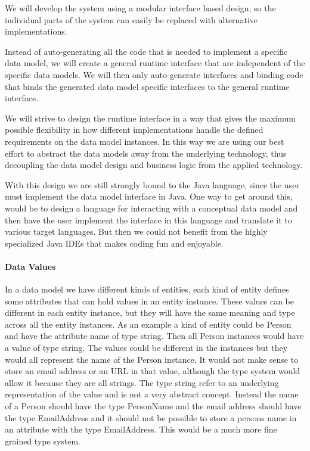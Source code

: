 We will develop the system using a modular interface based design,
so the individual parts of the system can easily be replaced with
alternative implementations.

Instead of auto-generating all the code that is needed to implement
a specific data model, we will create a general runtime interface
that are independent of the specific data models. We will then only
auto-generate interfaces and binding code that binds the generated
data model specific interfaces to the general runtime interface.

We will strive to design the runtime interface in a way that gives
the maximum possible flexibility in how different implementations
handle the defined requirements on the data model instances. In this
way we are using our best effort to abstract the data models away
from the underlying technology, thus decoupling the data model design
and business logic from the applied technology.

With this design we are still strongly bound to the Java language,
since the user must implement the data model interface in Java. One
way to get around this, would be to design a language for interacting
with a conceptual data model and then have the user implement the
interface in this language and translate it to various target languages.
But then we could not benefit from the highly specialized Java IDEs
that makes coding fun and enjoyable.


\paragraph{Data Values}

In a data model we have different kinds of entities, each kind of
entity defines some attributes that can hold values in an entity instance.
These values can be different in each entity instance, but they will
have the same meaning and type across all the entity instances. As
an example a kind of entity could be Person and have the attribute
name of type string. Then all Person instances would have a value
of type string. The values could be different in the instances but
they would all represent the name of the Person instance. It would
not make sense to store an email address or an URL in that value,
although the type system would allow it because they are all strings.
The type string refer to an underlying representation of the value
and is not a very abstract concept. Instead the name of a Person should
have the type PersonName and the email address should have the type
EmailAddress and it should not be possible to store a persons name
in an attribute with the type EmailAddress. This would be a much more
fine grained type system.

